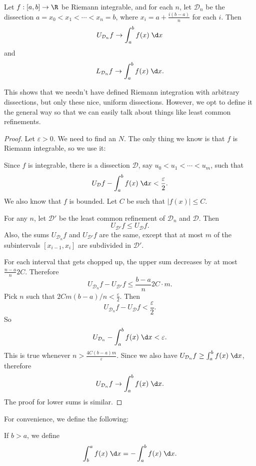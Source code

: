 \documentclass[a4paper]{article}
\begin{document}
\begin{lemma}
  Let $f: [a, b] \to \R$ be Riemann integrable, and for each $n$, let $\mathcal{D}_n$ be the dissection $a = x_0 < x_1 < \cdots < x_n = b$, where $x_i = a + \frac{i(b - a)}{n}$ for each $i$. Then
  \[
    U_{\mathcal{D}_n}f \to \int_a^b f(x)\;\d x
  \]
  and
  \[
    L_{\mathcal{D}_n}f \to \int_a^b f(x)\;\d x.
  \]
\end{lemma}
This shows that we needn't have defined Riemann integration with arbitrary dissections, but only these nice, uniform dissections. However, we opt to define it the general way so that we can easily talk about things like least common refinements.

\begin{proof}
  Let $\varepsilon > 0$. We need to find an $N$. The only thing we know is that $f$ is Riemann integrable, so we use it:

  Since $f$ is integrable, there is a dissection $\mathcal{D}$, say $u_0 < u_1 < \cdots < u_m$, such that
  \[
    U_\mathcal{D} f - \int_a^b f(x)\;\d x < \frac{\varepsilon}{2}.
  \]
  We also know that $f$ is bounded. Let $C$ be such that $|f(x)| \leq C$.

  For any $n$, let $\mathcal{D}'$ be the least common refinement of $\mathcal{D}_n$ and $\mathcal{D}$. Then
  \[
    U_{\mathcal{D}'}f \leq U_\mathcal{D} f.
  \]
  Also, the sums $U_{\mathcal{D}_n}f$ and $U_\mathcal{D'}f$ are the same, except that at most $m$ of the subintervals $[x_{i - 1}, x_i]$ are subdivided in $\mathcal{D}'$.

  For each interval that gets chopped up, the upper sum decreases by at most $\frac{n - a}{n}2 C$. Therefore
  \[
    U_{\mathcal{D}_n}f - U_{\mathcal{D}'}f \leq \frac{b - a}{n}2C\cdot m.
  \]
  Pick $n$ such that $2Cm(b - a)/n < \frac{\varepsilon}{2}$.  Then
  \[
    U_{\mathcal{D}_n} f - U_\mathcal{D}f < \frac{\varepsilon}{2}.
  \]
  So
  \[
    U_{\mathcal{D}_n} - \int_a^b f(x)\;\d x < \varepsilon.
  \]
  This is true whenever $n > \frac{4C(b - a)m}{\varepsilon}$. Since we also have $U_{\mathcal{D}_n} f \geq \int_a^b f(x)\;\d x$, therefore
  \[
    U_{\mathcal{D}_n}f \to \int_a^b f(x)\;\d x.
  \]
  The proof for lower sums is similar.
\end{proof}

For convenience, we define the following:
\begin{notation}
  If $b > a$, we define
  \[
    \int_b^a f(x)\;\d x = -\int_a^b f(x)\;\d x.
  \]
\end{notation}
\end{document}
